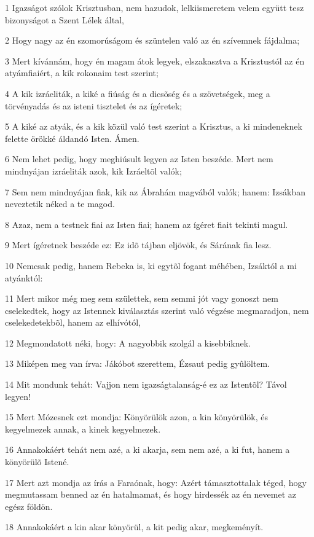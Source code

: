 \par 1 Igazságot szólok Krisztusban, nem hazudok, lelkiismeretem velem együtt tesz bizonyságot a Szent Lélek által,
\par 2 Hogy nagy az én szomorúságom és szüntelen való az én szívemnek fájdalma;
\par 3 Mert kívánnám, hogy én magam átok legyek, elszakasztva a Krisztustól az én atyámfiaiért, a kik rokonaim test szerint;
\par 4 A kik izráeliták, a kiké a fiúság és a dicsõség és a szövetségek, meg a  törvényadás és az isteni tisztelet és az ígéretek;
\par 5 A kiké az atyák, és a kik közül való test szerint a Krisztus, a ki mindeneknek felette örökké áldandó  Isten. Ámen.
\par 6 Nem lehet pedig, hogy meghiúsult legyen az Isten beszéde. Mert nem mindnyájan izráeliták azok, kik Izráeltõl valók;
\par 7 Sem nem mindnyájan fiak, kik az Ábrahám magvából valók; hanem: Izsákban neveztetik néked a te magod.
\par 8 Azaz, nem a testnek fiai az Isten fiai; hanem az ígéret fiait tekinti magul.
\par 9 Mert ígéretnek beszéde ez: Ez idõ tájban eljövök, és Sárának fia lesz.
\par 10 Nemcsak pedig, hanem Rebeka is, ki egytõl fogant méhében, Izsáktól a mi atyánktól:
\par 11 Mert mikor még meg sem születtek, sem semmi jót vagy gonoszt nem cselekedtek, hogy az Istennek kiválasztás szerint való végzése megmaradjon, nem cselekedetekbõl, hanem az elhívótól,
\par 12 Megmondatott néki, hogy: A nagyobbik szolgál a kisebbiknek.
\par 13 Miképen meg van írva: Jákóbot szerettem, Ézsaut pedig gyûlöltem.
\par 14 Mit mondunk tehát: Vajjon nem igazságtalanság-é ez az Istentõl? Távol legyen!
\par 15 Mert Mózesnek ezt mondja: Könyörülök azon, a kin könyörülök, és kegyelmezek annak, a kinek kegyelmezek.
\par 16 Annakokáért tehát nem azé, a ki akarja, sem nem azé, a ki fut, hanem a könyörülõ Istené.
\par 17 Mert azt mondja az írás a Faraónak, hogy: Azért támasztottalak téged, hogy megmutassam benned az én hatalmamat, és hogy hirdessék az én nevemet az egész földön.
\par 18 Annakokáért a kin akar könyörül, a kit pedig akar, megkeményít.
